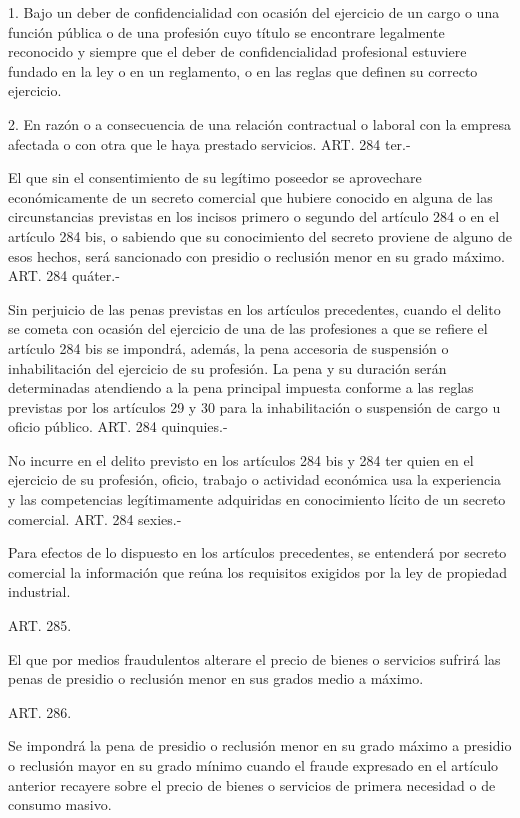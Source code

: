     1. Bajo un deber de confidencialidad con ocasión del ejercicio de un cargo o una función pública o de una profesión cuyo título se encontrare legalmente reconocido y siempre que el deber de confidencialidad profesional estuviere fundado en la ley o en un reglamento, o en las reglas que definen su correcto ejercicio.

    2. En razón o a consecuencia de una relación contractual o laboral con la empresa afectada o con otra que le haya prestado servicios.
    ART. 284 ter.-

    El que sin el consentimiento de su legítimo poseedor se aprovechare económicamente de un secreto comercial que hubiere conocido en alguna de las circunstancias previstas en los incisos primero o segundo del artículo 284 o en el artículo 284 bis, o sabiendo que su conocimiento del secreto proviene de alguno de esos hechos, será sancionado con presidio o reclusión menor en su grado máximo.
    ART. 284 quáter.-

    Sin perjuicio de las penas previstas en los artículos precedentes, cuando el delito se cometa con ocasión del ejercicio de una de las profesiones a que se refiere el artículo 284 bis se impondrá, además, la pena accesoria de suspensión o inhabilitación del ejercicio de su profesión.
    La pena y su duración serán determinadas atendiendo a la pena principal impuesta conforme a las reglas previstas por los artículos 29 y 30 para la inhabilitación o suspensión de cargo u oficio público.
    ART. 284 quinquies.-

    No incurre en el delito previsto en los artículos 284 bis y 284 ter quien en el ejercicio de su profesión, oficio, trabajo o actividad económica usa la experiencia y las competencias legítimamente adquiridas en conocimiento lícito de un secreto comercial.
    ART. 284 sexies.-

    Para efectos de lo dispuesto en los artículos precedentes, se entenderá por secreto comercial la información que reúna los requisitos exigidos por la ley de propiedad industrial.

    ART. 285.

    El que por medios fraudulentos alterare el precio de bienes o servicios sufrirá las penas de presidio o reclusión menor en sus grados medio a máximo.


    ART. 286.

    Se impondrá la pena de presidio o reclusión menor en su grado máximo a presidio o reclusión mayor en su grado mínimo cuando el fraude expresado en el artículo anterior recayere sobre el precio de bienes o servicios de primera necesidad o de consumo masivo.


